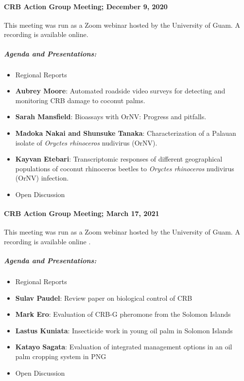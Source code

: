 \documentclass[12pt,letterpaper,english,bibliography=totocnumbered,abstract=on]{scrartcl}
\begin{document}
\paragraph{CRB Action Group Meeting; December 9, 2020}
This meeting was run as a Zoom webinar hosted by the University of Guam. A recording is available online.\cite{mooreVideoRecordingCRBG2021}

\subparagraph{Agenda and Presentations:}

\begin{itemize}
\item Regional Reports
\item \textbf{Aubrey Moore}: Automated roadside video surveys for detecting and monitoring CRB damage to coconut palms. \cite{mooreAutomatedRoadsideVideo2020}
\item \textbf{Sarah Mansfield}: Bioassays with OrNV: Progress and pitfalls.
\item \textbf{Madoka Nakai and Shunsuke Tanaka}: Characterization of a Palauan isolate of \textit{Oryctes rhinoceros} nudivirus (OrNV).
\item \textbf{Kayvan Etebari}: Transcriptomic responses of different geographical populations of coconut rhinoceros beetles to \textit{Oryctes rhinoceros} nudivirus (OrNV) infection.
\item Open Discussion	
\end{itemize}

\paragraph{CRB Action Group Meeting; March 17, 2021}
This meeting was run as a Zoom webinar hosted by the University of Guam. A recording is available online \cite{mooreVideoRecordingCRBG2020}.

\subparagraph{Agenda and Presentations:}
\begin{itemize}
\item Regional Reports
\item \textbf{Sulav Paudel}: Review paper on biological control of CRB
\item \textbf{Mark Ero}: Evaluation of CRB-G pheromone from the Solomon Islands
\item \textbf{Lastus Kuniata}: Insecticide work in young oil palm in Solomon Islands
\item \textbf{Katayo Sagata}: Evaluation of integrated management options in an oil palm cropping system in PNG
\item Open Discussion	
\end{itemize}
\end{document}
